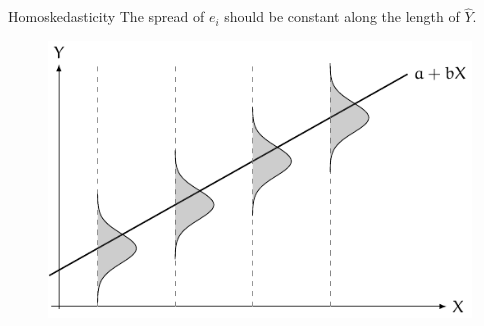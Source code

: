 \documentclass[12pt,english,pdf,xcolor=dvipsnames,aspectratio=169,handout]{beamer}\usepackage[]{graphicx}\usepackage[]{xcolor}
\begin{document}
\begin{frame}{Homoskedasticity}
The spread of $e_i$ should be constant along the length of $\hat{Y}$.\bigskip

\begin{figure}
\includegraphics{../04-graphs/01-03.pdf}
\end{figure}

\end{frame}
\end{document}
